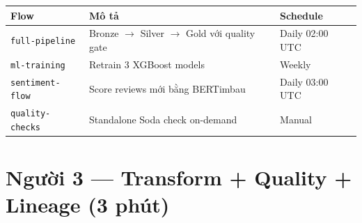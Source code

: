 \documentclass[12pt, a4paper]{article}
\begin{document}
\begin{tcolorbox}[colback=gray!5, colframe=p2color!50, arc=6pt,
  title={\faSitemap\ Sơ đồ 2 — Prefect Full Pipeline Flow}]
\begin{center}
\end{center}

\begin{center}
\footnotesize
\begin{tabular}{lll}
\toprule
Flow & Mô tả & Schedule \\
\midrule
\texttt{full-pipeline} & Bronze $\to$ Silver $\to$ Gold với quality gate & Daily 02:00 UTC \\
\texttt{ml-training} & Retrain 3 XGBoost models & Weekly \\
\texttt{sentiment-flow} & Score reviews mới bằng BERTimbau & Daily 03:00 UTC \\
\texttt{quality-checks} & Standalone Soda check on-demand & Manual \\
\bottomrule
\end{tabular}
\end{center}

\end{tcolorbox}

\newpage

\section{Người 3 — Transform + Quality + Lineage (3 phút)}
\end{document}
